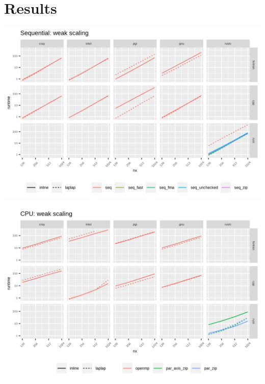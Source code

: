 \documentclass[aspectratio=43, t]{beamer}
\begin{document}
\section*{Results}
\begin{frame}
	\centering
	\includegraphics[width = \textwidth, height = \textheight, keepaspectratio]{weak_scaling_seq}
	\par
\end{frame}

\begin{frame}
	\centering
	\includegraphics[width = \textwidth, height = \textheight, keepaspectratio]{weak_scaling_cpu}
	\par
\end{frame}
\end{document}
